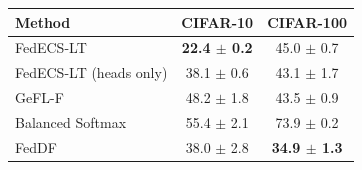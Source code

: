 \begin{tabular}{lcc}
\toprule
Method & CIFAR-10 & CIFAR-100\\
\midrule
FedECS-LT & \textbf{22.4 $\pm$ 0.2} & 45.0 $\pm$ 0.7\\
FedECS-LT (heads only) & 38.1 $\pm$ 0.6 & 43.1 $\pm$ 1.7\\
GeFL-F & 48.2 $\pm$ 1.8 & 43.5 $\pm$ 0.9\\
Balanced Softmax & 55.4 $\pm$ 2.1 & 73.9 $\pm$ 0.2\\
FedDF & 38.0 $\pm$ 2.8 & \textbf{34.9 $\pm$ 1.3}\\
\bottomrule
\end{tabular}
